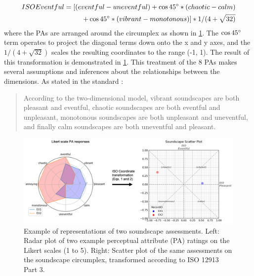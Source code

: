 \begin{equation}
  \begin{split}
    \label{eqn:eventful}
    ISO Eventful = [(eventful - uneventful) + \cos 45\degree * (chaotic - calm) \\ + \cos 45\degree * (vibrant - monotonous)] * 1/(4+\sqrt{32)}
  \end{split}
\end{equation}
where the PAs are arranged around the circumplex as shown in \cref{fig:radar}. The $\cos 45\degree$ term operates to project the diagonal terms down onto the x and y axes, and the $1 \slash (4 + \sqrt{32})$ scales the resulting coordinates to the range (-1, 1). The result of this transformation is demonstrated in \cref{fig:radar}. This treatment of the 8 PAs makes several assumptions and inferences about the relationships between the dimensions. As stated in the standard \citep[p. 5]{ISO12913Part3}:

\begin{quote}
  According to the two-dimensional model, vibrant soundscapes are both pleasant and eventful, chaotic soundscapes are both eventful and unpleasant, monotonous soundscapes are both unpleasant and uneventful, and finally calm soundscapes are both uneventful and pleasant.
\end{quote}

\begin{figure}
  \includegraphics[width=\textwidth]{Figures/jasa-el_Figure1.png}
  \caption{Example of representations of two soundscape assessments. Left: Radar plot of two example perceptual attribute (PA) ratings on the Likert scales (1 to 5). Right: Scatter plot of the same assessments on the soundscape circumplex, transformed according to ISO 12913 Part 3.
    \label{fig:radar}
  }
\end{figure}

